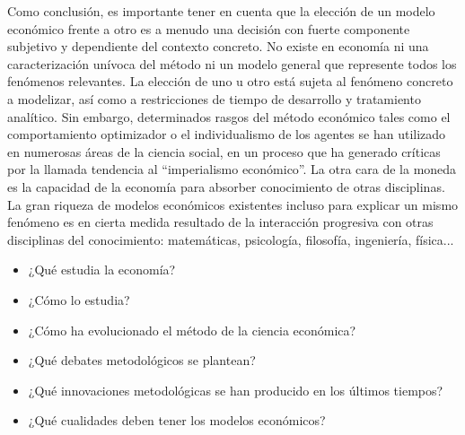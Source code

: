 \documentclass{nuevotema}
\begin{document}
Como conclusión, es importante tener en cuenta que la elección de un modelo económico frente a otro es a menudo una decisión con fuerte componente subjetivo y dependiente del contexto concreto. No existe en economía ni una caracterización unívoca del método ni un modelo general que represente todos los fenómenos relevantes. La elección de uno u otro está sujeta al fenómeno concreto a modelizar, así como a restricciones de tiempo de desarrollo y tratamiento analítico. Sin embargo, determinados rasgos del método económico tales como el comportamiento optimizador o el individualismo de los agentes se han utilizado en numerosas áreas de la ciencia social, en un proceso que ha generado críticas por la llamada tendencia al ``imperialismo económico''. La otra cara de la moneda es la capacidad de la economía para absorber conocimiento de otras disciplinas. La gran riqueza de modelos económicos existentes incluso para explicar un mismo fenómeno es en cierta medida resultado de la interacción progresiva con otras disciplinas del conocimiento: matemáticas, psicología, filosofía, ingeniería, física...

\begin{itemize}
	\item ¿Qué estudia la economía?
	\item ¿Cómo lo estudia?
	\item ¿Cómo ha evolucionado el método de la ciencia económica?
	\item ¿Qué debates metodológicos se plantean?
	\item ¿Qué innovaciones metodológicas se han producido en los últimos tiempos?
	\item ¿Qué cualidades deben tener los modelos económicos?
\end{itemize}

\esquemacorto
\end{document}
